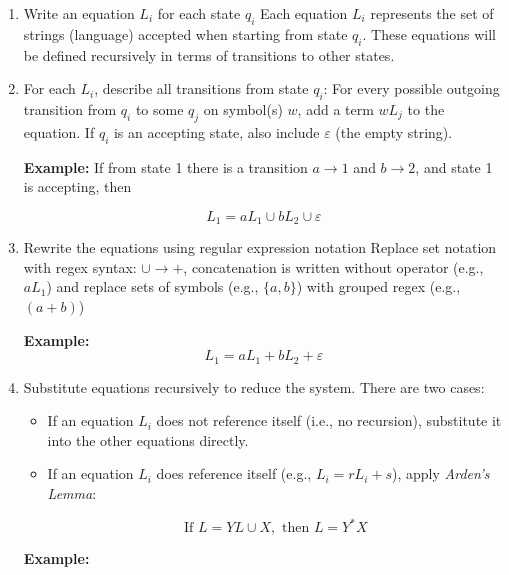 \begin{enumerate}

    \item Write an equation \(L_i\) for each state \(q_i\) 
    Each equation \(L_i\) represents the set of strings (language) accepted when starting from state 
    \(q_i\). These equations will be defined recursively in terms of transitions to other states.

    \item For each \(L_i\), describe all transitions from state \(q_i\):  
    For every possible outgoing transition from \(q_i\) to some \(q_j\) on symbol(s) \(w\), add a term 
    \(w L_j\) to the equation. If \(q_i\) is an accepting state, also include \(\varepsilon\) (the empty 
    string).

    \textbf{Example:} If from state 1 there is a transition \(a \to 1\) and \(b \to 2\), and state 1 is 
    accepting, then  
    
    \[
        L_1 = a L_1 \cup b L_2 \cup \varepsilon
    \]

    \item Rewrite the equations using regular expression notation  
    Replace set notation with regex syntax: \(\cup \to +\),  concatenation is written without operator 
    (e.g., \(a L_1\)) and replace sets of symbols (e.g., \(\{a, b\}\)) with grouped regex (e.g., \((a + b)\))

    \textbf{Example:}  
    \[
        L_1 = a L_1 + b L_2 + \varepsilon
    \]

    \item Substitute equations recursively to reduce the system. There are two cases:  
    
    \begin{itemize}
        
        \item If an equation \(L_i\) does not reference itself (i.e., no recursion), substitute 
        it into the other equations directly.
        
        \item If an equation \(L_i\) does reference itself (e.g., \(L_i = r L_i + s\)), apply 
        \emph{Arden's Lemma}:  
        
        \[
            \text{If } L = YL \cup X, \text{ then } L = Y^*X
        \]
    
    \end{itemize}

    \textbf{Example:}  \begin{enumerate}
    

\end{enumerate}
\end{enumerate}
